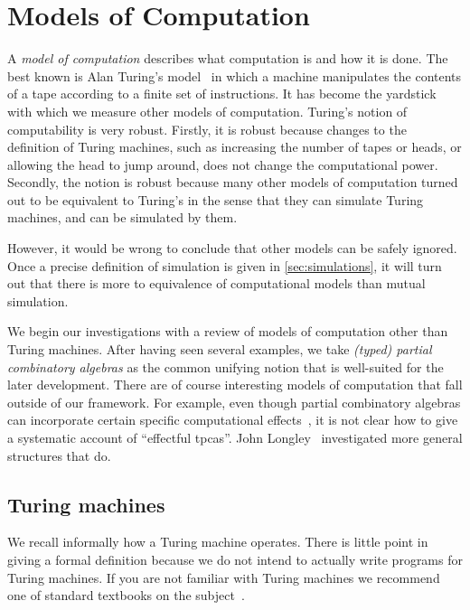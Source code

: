 \chapter{Models of Computation}
\label{cha:models}


A \emph{model of computation} describes what computation is and how it
is done. The best known is Alan Turing's
model~ in which a
machine manipulates the contents of a tape according to a finite set
of instructions. It has become the yardstick with which we measure
other models of computation. Turing's notion of computability is very
robust. Firstly, it is robust because changes to the definition of
Turing machines, such as increasing the number of tapes or heads, or
allowing the head to jump around, does not change the computational
power. Secondly, the notion is robust because many other models of
computation turned out to be equivalent to Turing's in the sense
that they can simulate Turing machines, and can be simulated by them.

However, it would be wrong to conclude that other models can be safely ignored. Once a precise definition of simulation
is given in \cref{sec:simulations}, it will turn out that there is more to equivalence of computational models than mutual simulation.

We begin our investigations with a review of models of computation other than Turing machines. After having seen several examples, we take \emph{(typed) partial combinatory algebras} as the common unifying notion that is well-suited for the later development.
%
There are of course interesting models of computation that fall outside of our framework.
For example, even though partial combinatory algebras can incorporate certain specific computational effects~, it is not clear how to give a systematic account of ``effectful tpcas''. John Longley~ investigated more general structures that do.



\section{Turing machines}
\label{sec:turing-machines}

We recall informally how a Turing machine operates. There is little
point in giving a formal definition because we do not intend to
actually write programs for Turing machines. If you are not familiar
with Turing machines we recommend one of standard textbooks on the
subject~.

